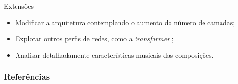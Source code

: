 \documentclass[xcolor=table]{beamer}
\begin{document}
    \begin{frame}{Extensões}
        \begin{itemize}
            \justifying
            \item Modificar a arquitetura contemplando o aumento do número de camadas;
            \item Explorar outros perfis de redes, como a \textit{transformer} \citep{vaswani2017};
            \item Analisar detalhadamente características musicais das composições.
        \end{itemize}
    \end{frame}



%
    \begin{frame}[allowframebreaks]
        \frametitle{Referências}
        
        
    \end{frame}
\end{document}
